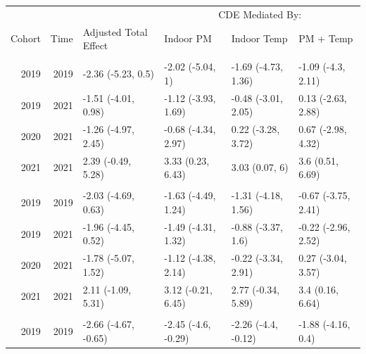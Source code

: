 \documentclass[
  letterpaper,
  DIV=11,
  numbers=noendperiod]{scrartcl}
\makeatletter
\renewenvironment{table}%
  {\renewcommand\familydefault\sfdefault
   \@float{table}}
  {\end@float}
\makeatother
\begin{document}
\hypertarget{tbl-a-bp-med-het}{}
\begin{table}
\caption{\label{tbl-a-bp-med-het}Heterogenous treatment effects for blood pressure mediation model }\tabularnewline

\centering
\begin{tabular}{rrllll}
\toprule
\multicolumn{3}{c}{ } & \multicolumn{3}{c}{CDE Mediated By:} \\
\cmidrule(l{3pt}r{3pt}){4-6}
Cohort & Time & Adjusted Total Effect & Indoor PM & Indoor Temp & PM + Temp\\
\midrule
\addlinespace[0.3em]
\multicolumn{6}{l}{\textbf{Brachial SBP}}\\
\hspace{1em}2019 & 2019 & -2.36 (-5.23, 0.5) & -2.02 (-5.04, 1) & -1.69 (-4.73, 1.36) & -1.09 (-4.3, 2.11)\\
\hspace{1em}2019 & 2021 & -1.51 (-4.01, 0.98) & -1.12 (-3.93, 1.69) & -0.48 (-3.01, 2.05) & 0.13 (-2.63, 2.88)\\
\hspace{1em}2020 & 2021 & -1.26 (-4.97, 2.45) & -0.68 (-4.34, 2.97) & 0.22 (-3.28, 3.72) & 0.67 (-2.98, 4.32)\\
\hspace{1em}2021 & 2021 & 2.39 (-0.49, 5.28) & 3.33 (0.23, 6.43) & 3.03 (0.07, 6) & 3.6 (0.51, 6.69)\\
\addlinespace[0.3em]
\multicolumn{6}{l}{\textbf{Central SBP}}\\
\hspace{1em}2019 & 2019 & -2.03 (-4.69, 0.63) & -1.63 (-4.49, 1.24) & -1.31 (-4.18, 1.56) & -0.67 (-3.75, 2.41)\\
\hspace{1em}2019 & 2021 & -1.96 (-4.45, 0.52) & -1.49 (-4.31, 1.32) & -0.88 (-3.37, 1.6) & -0.22 (-2.96, 2.52)\\
\hspace{1em}2020 & 2021 & -1.78 (-5.07, 1.52) & -1.12 (-4.38, 2.14) & -0.22 (-3.34, 2.91) & 0.27 (-3.04, 3.57)\\
\hspace{1em}2021 & 2021 & 2.11 (-1.09, 5.31) & 3.12 (-0.21, 6.45) & 2.77 (-0.34, 5.89) & 3.4 (0.16, 6.64)\\
\addlinespace[0.3em]
\multicolumn{6}{l}{\textbf{Brachial DBP}}\\
\hspace{1em}2019 & 2019 & -2.66 (-4.67, -0.65) & -2.45 (-4.6, -0.29) & -2.26 (-4.4, -0.12) & -1.88 (-4.16, 0.4)\\

\end{tabular}
\end{table}
\end{document}
